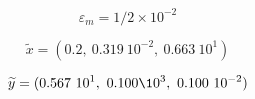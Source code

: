 \[ \varepsilon_m=1/2 \times 10^{-2} \]

\medskip
\[ \widetilde{x}=(0.2, \ 0.319\ 10^{-2}, \ 0.663\ 10^1) \]

\medskip
\[ \widetilde{y}=( 0.567\ 10^1,\ 0.100\10^3, \ 0.100\ 10^{-2}) \]
